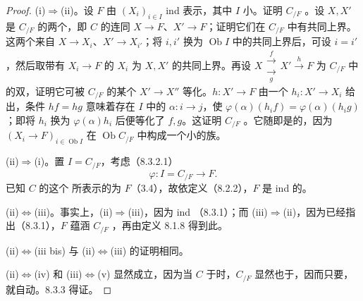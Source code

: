 \begin{proof}
(i)$\Rightarrow$(ii)。设 $F$ 由 $(X_i)_{i\in I}$ ind 表示，其中 $I$ 小。证明 $C_{/F}$ 。设 $X,X'$ 是 $C_{/F}$ 的两个，即 $C$ 的连同 $X\to F$、$X'\to F$；证明它们在 $C_{/F}$ 中有共同上界。这两个来自 $X\to X_i$、$X'\to X_{i'}$；将 $i,i'$ 换为 $\operatorname{Ob}I$ 中的共同上界后，可设 $i=i'$，然后取带有 $X_i\to F$ 的 $X_i$ 为 $X,X'$ 的共同上界。再设 $X\mathrel{\substack{\xrightarrow f\\[-.6ex]\xrightarrow[g]{}}}X'\xrightarrow hF$ 为 $C_{/F}$ 中的双，证明它可被 $C_{/F}$ 的某个 $X'\to X''$ 等化。$h:X'\to F$ 由一个 $h_i:X'\to X_i$ 给出，条件 $hf=hg$ 意味着存在 $I$ 中的 $\alpha:i\to j$，使 $\varphi(\alpha)(h_i f)=\varphi(\alpha)(h_i g)$；即将 $h_i$ 换为 $\varphi(\alpha)h_i$ 后便等化了 $f,g$。这证明 $C_{/F}$ 。它随即是的，因为 $(X_i\to F)_{i\in\operatorname{Ob}I}$ 在 $\operatorname{Ob}C_{/F}$ 中构成一个小的族。

(ii)$\Rightarrow$(i)。置 $I=C_{/F}$，考虑（8.3.2.1）
\[
\varphi:I=C_{/F}\longrightarrow F.
\]
已知 $C$ 的这个 所表示的为 $F$（3.4），故依定义（8.2.2），$F$ 是 ind 的。

(ii)$\Leftrightarrow$(iii)。事实上，(ii)$\Rightarrow$(iii)，因为 ind （8.3.1）；而 (iii)$\Rightarrow$(ii)，因为已经指出（8.3.1），$F$ 蕴涵 $C_{/F}$ ，再由定义 8.1.8 得到此。

(ii)$\Leftrightarrow$(iii bis) 与 (ii)$\Leftrightarrow$(iii) 的证明相同。

 (ii)$\Leftrightarrow$(iv) 和 (iii)$\Leftrightarrow$(v) 显然成立，因为当 $C$ 于时，$C_{/F}$ 显然也于，因而只要，就自动。8.3.3 得证。
\end{proof}
